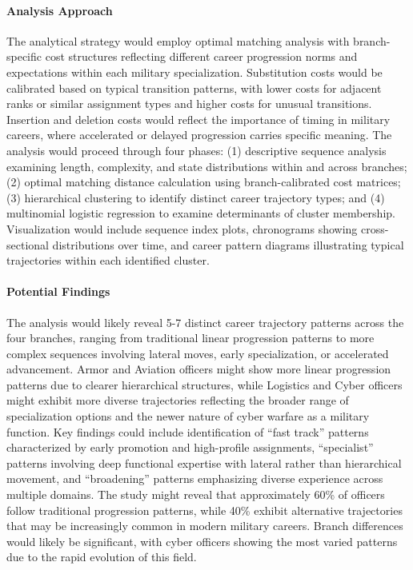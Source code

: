 \documentclass[./main.tex]{subfiles}
\begin{document}
\paragraph{Analysis Approach}\label{analysis-approach}

The analytical strategy would employ optimal matching analysis with
branch-specific cost structures reflecting different career progression
norms and expectations within each military specialization. Substitution
costs would be calibrated based on typical transition patterns, with
lower costs for adjacent ranks or similar assignment types and higher
costs for unusual transitions. Insertion and deletion costs would
reflect the importance of timing in military careers, where accelerated
or delayed progression carries specific meaning. The analysis would
proceed through four phases: (1) descriptive sequence analysis examining
length, complexity, and state distributions within and across branches;
(2) optimal matching distance calculation using branch-calibrated cost
matrices; (3) hierarchical clustering to identify distinct career
trajectory types; and (4) multinomial logistic regression to examine
determinants of cluster membership. Visualization would include sequence
index plots, chronograms showing cross-sectional distributions over
time, and career pattern diagrams illustrating typical trajectories
within each identified cluster.

\paragraph{Potential Findings}\label{potential-findings}

The analysis would likely reveal 5-7 distinct career trajectory patterns
across the four branches, ranging from traditional linear progression
patterns to more complex sequences involving lateral moves, early
specialization, or accelerated advancement. Armor and Aviation officers
might show more linear progression patterns due to clearer hierarchical
structures, while Logistics and Cyber officers might exhibit more
diverse trajectories reflecting the broader range of specialization
options and the newer nature of cyber warfare as a military function.
Key findings could include identification of ``fast track'' patterns
characterized by early promotion and high-profile assignments,
``specialist'' patterns involving deep functional expertise with lateral
rather than hierarchical movement, and ``broadening'' patterns
emphasizing diverse experience across multiple domains. The study might
reveal that approximately 60\% of officers follow traditional
progression patterns, while 40\% exhibit alternative trajectories that
may be increasingly common in modern military careers. Branch
differences would likely be significant, with cyber officers showing the
most varied patterns due to the rapid evolution of this field.
\end{document}

